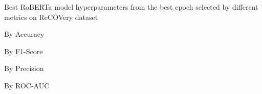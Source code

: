 \begin{table}[!htbp]
    \caption{Best RoBERTa model hyperparameters from the best epoch selected by different metrics on ReCOVery dataset}
    \label{tab:recovery_roberta_hparams}
    \centering

    \begin{subtable}[t]{0.48\linewidth}
        \scriptsize
        \caption{By Accuracy}
        
    \end{subtable}
    \hfill
    \begin{subtable}[t]{0.48\linewidth}
        \scriptsize
        \caption{By F1-Score}
        
    \end{subtable}

    \vspace{1em}

    \begin{subtable}[t]{0.48\linewidth}
        \scriptsize
        \caption{By Precision}
        
    \end{subtable}
    \hfill
    \begin{subtable}[t]{0.48\linewidth}
        \scriptsize
        \caption{By ROC-AUC}
        
    \end{subtable}


\end{table}